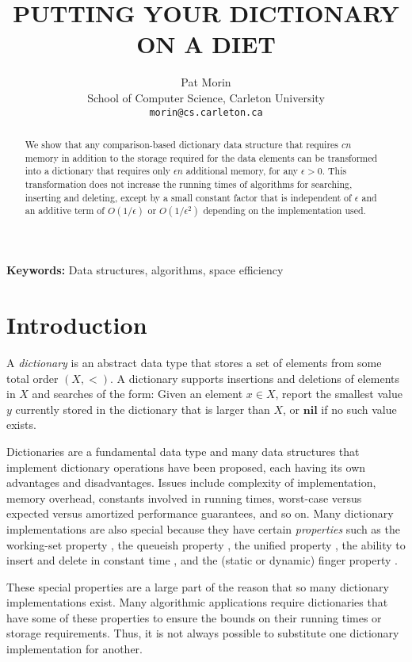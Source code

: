 \documentclass[lotsofwhite]{patmorin}
\date{}
\title{\MakeUppercase{Putting your Dictionary on a Diet}}
\author{Pat Morin \\ School of Computer Science, Carleton University \\
	\texttt{morin@cs.carleton.ca}}
\begin{document}
\maketitle
\begin{abstract}
We show that any comparison-based dictionary data structure that
requires $cn$ memory in addition to the storage required for the data
elements can be transformed into a dictionary that requires only
$\epsilon n$ additional memory, for any $\epsilon > 0$.  This
transformation does not increase the running times of algorithms for
searching, inserting and deleting, except by a small constant factor
that is independent of $\epsilon$ and an additive term of
$O(1/\epsilon)$ or $O(1/\epsilon^2)$ depending on the implementation
used.
\end{abstract}

\noindent\textbf{Keywords:} Data structures, algorithms, space efficiency
\section{Introduction}
\newcommand{\nil}{\mathbf{nil}}

A \emph{dictionary} is an abstract data type that stores a set of
elements from some total order $(X,<)$.  A dictionary supports
insertions and deletions of elements in $X$ and searches of the form:
Given an element $x\in X$, report the smallest value $y$ currently
stored in the dictionary that is larger than $X$, or $\nil$ if no such
value exists.

Dictionaries are a fundamental data type and many data structures that
implement dictionary operations have been proposed, each having its
own advantages and disadvantages.  Issues include complexity of
implementation, memory overhead, constants involved in running times,
worst-case versus expected versus amortized performance guarantees,
and so on.  Many dictionary implementations are also special because
they have certain \emph{properties} such as the working-set property
\cite{i01,st85b}, the queueish property \cite{il02}, the unified
property \cite{i01,st85b}, the ability to insert and delete in
constant time \cite{hm82}, and the (static or dynamic) finger property
\cite{as96,bt80,c95,gmpr77,hm82}.

These special properties are a large part of the reason that so many
dictionary implementations exist.  Many algorithmic applications
require dictionaries that have some of these properties to ensure the
bounds on their running times or storage requirements.  Thus, it is
not always possible to substitute one dictionary implementation for
another.
\end{document}
